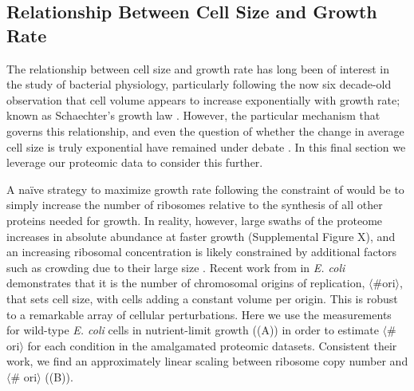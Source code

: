 
\subsection{Relationship Between Cell Size and Growth Rate}
The relationship between cell size and growth rate has long been of interest in
the study of bacterial physiology, particularly following the now six decade-old
observation that cell volume appears to increase exponentially with growth rate;
known as Schaechter's growth law  \citep{schaechter1958, taheriaraghi2015}.
However, the particular mechanism that governs this relationship, and even the
question of whether the change in average cell size is truly exponential have
remained under debate \citep{harris2018}. In this final section we leverage our
proteomic data to consider this further.

A na\"ive strategy to maximize growth rate following the constraint of
 would be to simply increase the number of
ribosomes relative to the synthesis of all other proteins needed for growth. In
reality, however, large swaths of the proteome increases in absolute abundance
at faster growth (Supplemental Figure X), and an increasing ribosomal
concentration is likely constrained by additional factors such as crowding due
to their large size \cite{delarue2018, solerbistue2020}. Recent work from
\cite{si2017} in \textit{E. coli} demonstrates that it is the number of
chromosomal origins of replication, $\langle\text{\# ori}\rangle$, that sets
cell size, with cells adding a constant volume per origin. This is robust to a
remarkable array of cellular perturbations. Here we use the measurements
\cite{si2017} for wild-type \textit{E. coli} cells in nutrient-limit growth
((A)) in order to estimate $\langle$\# ori$\rangle$
for each condition in the amalgamated proteomic datasets. Consistent their work,
we find an approximately linear scaling between ribosome copy number and
$\langle$\# ori$\rangle$ ((B)).

